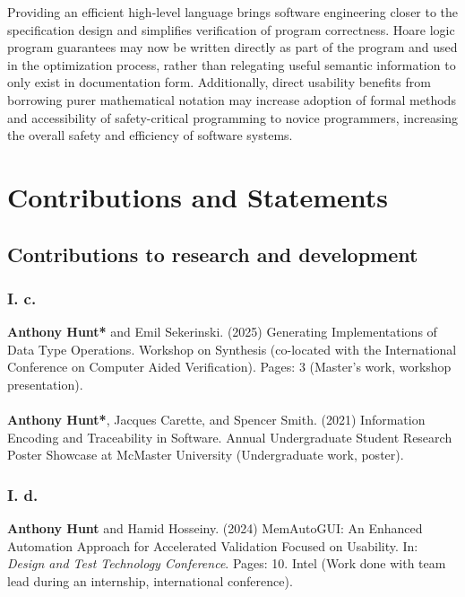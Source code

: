 \documentclass[12pt]{article}
\begin{document}
Providing an efficient high-level language brings software engineering closer to the specification design and simplifies verification of program correctness. Hoare logic program guarantees may now be written directly as part of the program and used in the optimization process, rather than relegating useful semantic information to only exist in documentation form. Additionally, direct usability benefits from borrowing purer mathematical notation may increase adoption of formal methods and accessibility of safety-critical programming to novice programmers, increasing the overall safety and efficiency of software systems.

\pagebreak
\section{Contributions and Statements}
\subsection{Contributions to research and development}

\subsubsection*{I. c.}
\textbf{Anthony Hunt*} and Emil Sekerinski. (2025) Generating Implementations of Data Type Operations. Workshop on Synthesis (co-located with the International Conference on Computer Aided Verification). Pages: 3 (Master's work, workshop presentation).
\\\\
\textbf{Anthony Hunt*}, Jacques Carette, and Spencer Smith. (2021) Information Encoding and Traceability in Software. Annual Undergraduate Student Research Poster Showcase at McMaster University (Undergraduate work, poster).

\subsubsection*{I. d.}
\textbf{Anthony Hunt} and Hamid Hosseiny. (2024) MemAutoGUI: An Enhanced Automation Approach for Accelerated Validation Focused on Usability. In: \textit{Design and Test Technology Conference}. Pages: 10. Intel (Work done with team lead during an internship, international conference).
\end{document}
